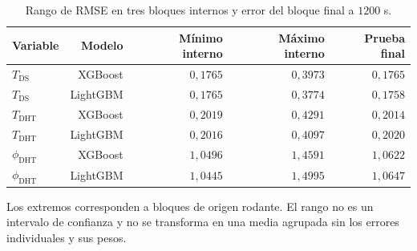 \begin{table}[htbp]
\centering
\caption{Rango de RMSE en tres bloques internos y error del bloque final a $1200$ s.}
\label{tab:res_validacion_ml}
\small
\setlength{\tabcolsep}{5pt}
\begin{tabular}{lrrrr}
\toprule
Variable & Modelo & Mínimo interno & Máximo interno & Prueba final \\
\midrule
$T_{\mathrm{DS}}$ & XGBoost & $0{,}1765$ & $0{,}3973$ & $0{,}1765$ \\
$T_{\mathrm{DS}}$ & LightGBM & $0{,}1765$ & $0{,}3774$ & $0{,}1758$ \\
$T_{\mathrm{DHT}}$ & XGBoost & $0{,}2019$ & $0{,}4291$ & $0{,}2014$ \\
$T_{\mathrm{DHT}}$ & LightGBM & $0{,}2016$ & $0{,}4097$ & $0{,}2020$ \\
$\phi_{\mathrm{DHT}}$ & XGBoost & $1{,}0496$ & $1{,}4591$ & $1{,}0622$ \\
$\phi_{\mathrm{DHT}}$ & LightGBM & $1{,}0445$ & $1{,}4995$ & $1{,}0647$ \\
\bottomrule
\end{tabular}
\par\vspace{3pt}
\begin{minipage}{0.98\textwidth}\footnotesize
Los extremos corresponden a bloques de origen rodante. El rango no es un intervalo de confianza y no se transforma en una media agrupada sin los errores individuales y sus pesos.
\end{minipage}
\end{table}

